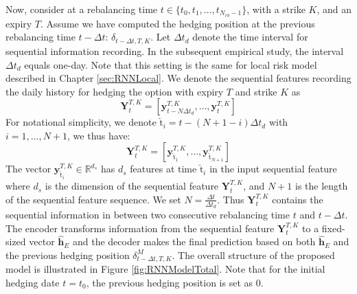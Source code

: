 \documentclass[letterpaper,12pt,titlepage,oneside,final]{book}
\numberwithin{equation}{section}
\theoremstyle{definition}
\newcommand{\vy}{\mathbf{y}}
\newcommand{\DT}{\Delta t}
\newcommand{\Real}{\mathbb{R}}
\newcommand{\nt}{\breve{\text{t}}}
\begin{document}
Now, consider at a  rebalancing time $t \in \{t_0,t_1, \dots, t_{N_{rb}-1}\}$, with a strike $K$, and an expiry $T$. Assume we have computed the hedging position at the previous rebalancing time $t-\Delta t$: $\delta_{t-\Delta t, T,K}$. Let $\DT_{d}$ denote the time interval for sequential information recording. In  the subsequent empirical study, the interval $\DT_{d}$ equals one-day. Note that this setting is the same for local risk model described in Chapter \ref{sec:RNNLocal}.  We denote the sequential features recording the daily history  for hedging the option with expiry $T$ and strike $K$ as
\[
\mathbf{Y}_{t}^{T,K}=\left[\vy^{T,K}_{t-N \DT_{d}},\dots,\vy^{T,K}_{t}\right]
\]
For notational simplicity, we denote $\nt_i=t-(N+1-i)\DT_d$ with $i=1, \dots,N+1$, we thus have:
\[
\mathbf{Y}_{t}^{T,K}=\left[\vy^{T,K}_{\nt_{1}},\dots,\vy^{T,K}_{\nt_{N+1}}\right]
\]
The vector $\vy^{T,K}_{\nt_{i}} \in \Real^{d_s}$ has  $d_s$ features at time $\nt_{i}$ in the input sequential feature where
$d_s$ is the dimension of the sequential feature $\mathbf{Y}_{t}^{T,K}$, and
$N+1$ is the length of the sequential feature sequence. We set $N=\frac{\Delta t}{\Delta t_d}$. Thus $\mathbf{Y}_{t}^{T,K}$ contains the sequential information in between two consecutive rebalancing time $t$ and $t-\Delta t$.
The encoder transforms information from the sequential feature $\mathbf{Y}_{t}^{T,K}$ to  a fixed-sized vector
$\mathbf{\widehat{h}}_E$   and the decoder makes the final prediction based on both $\mathbf{\widehat{h}}_E$  and the previous hedging position $\delta^{M}_{t-\Delta t,T,K}$. The overall structure of the proposed model is illustrated in Figure \ref{fig:RNNModelTotal}. Note that for the initial hedging date $t=t_0$, the previous hedging position is set as $0$.
\end{document}
